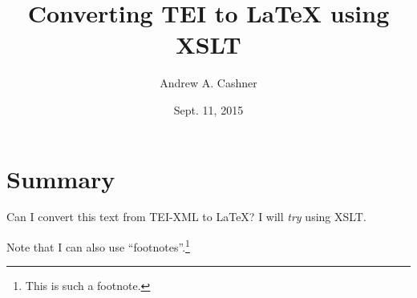 \documentclass{memoir}
\begin{document}
    
    \frontmatter
    
    \begin{titlingpage}
    
    \title{Converting TEI to LaTeX using XSLT}
  
    \author{Andrew A. Cashner}
  
    \date{Sept. 11, 2015}
  
    \maketitle
    \end{titlingpage}
    \tableofcontents*
  
    \mainmatter
    
    \section{Summary}
  
	  Can I convert this text from TEI-XML to LaTeX?
	  I will \emph{try} using XSLT.
	
	  Note that I can also use \enquote{footnotes}.\footnote{This is such a footnote.}
    
\end{document}
